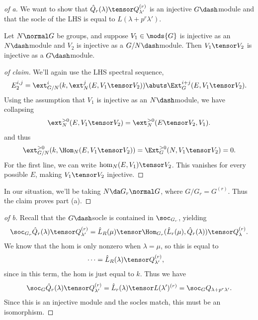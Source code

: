 \begin{proof}[of a]

We want to show that \(\hat Q_r(\lambda) \tensor Q_{\lambda'}^{(r)}\) is
an injective \(G\dash\)module and that the socle of the LHS is equal to
\(L(\lambda + p^r \lambda')\).

\begin{claim}

Let \(N\normal G\) be groups, and suppose \(V_1 \in \mods{G}\) is
injective as an \(N\dash\)module and \(V_2\) is injective as a
\(G/N\dash\)module. Then \(V_1 \tensor V_2\) is injective as a
\(G\dash\)module.

\end{claim}

\begin{proof}[of claim]

We'll again use the LHS spectral sequence,
\begin{align*}  
E_{2}^{i, j} = \ext_{G/N}^i(k, \ext_N^j(E, V_1\tensor V_2) )
\abuts
\Ext_G^{i+j}(E, V_1 \tensor V_2)
.\end{align*} Using the assumption that \(V_1\) is injective as an
\(N\dash\)module, we have collapsing
\begin{align*}  
\ext_N^{>0}(E, V_1\tensor V_2) = \ext_N^{>0} (E\tensor V_2, V_1)
.\end{align*} and thus
\begin{align*}  
\ext_{G/N}^{>0}(k, \Hom_N(E, V_1\tensor V_2) )
= \Ext_G^{>0}(N, V_1\tensor V_2)
= 0
.\end{align*} For the first line, we can write
\(\hom_N(E, V_1) \tensor V_2\). This vanishes for every possible \(E\),
making \(V_1\tensor V_2\) injective.

\end{proof}

In our situation, we'll be taking \(N\da G_r \normal G\), where
\(G/G_r = G^{(r)}\). Thus the claim proves part (a).

\end{proof}

\begin{proof}[of b]

Recall that the \(G\dash\)socle is contained in \(\soc_{G_r}\), yielding
\begin{align*}  
\soc_{G_r} \hat Q_r(\lambda) \tensor Q_{\lambda'}^{(r)} 
= \hat L_R(\mu) \tensor \Hom_{G_r}( \hat L_r(\mu), \hat Q_r(\lambda)  ) \tensor Q_{\lambda}^{(r)}
.\end{align*} We know that the hom is only nonzero when
\(\lambda = \mu\), so this is equal to
\begin{align*}  
\cdots
&= \hat{L}_R(\lambda) \tensor Q_{\lambda'}^{(r)}
,\end{align*} since in this term, the hom is just equal to \(k\). Thus
we have
\begin{align*}  
\soc_G \hat Q_r(\lambda) \tensor Q_{\lambda'}^{(r)}
= \hat L_r(\lambda) \tensor L(\lambda')^{(r)} = \soc_G Q_{\lambda+ p^r \lambda'}
.\end{align*} Since this is an injective module and the socles match,
this must be an isomorphism.

\end{proof}

